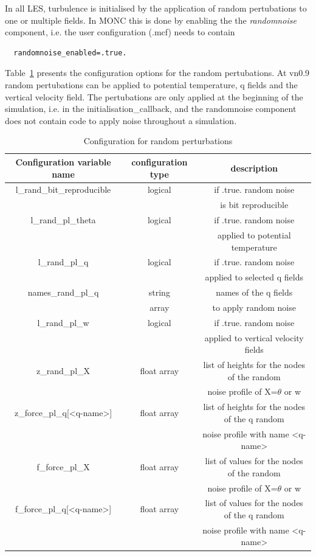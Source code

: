 \documentclass[a4paper,11pt]{article}
\begin{document}
In all LES, turbulence is initialised by the application of random pertubations to one or
multiple fields. In MONC this is done by enabling the the \emph{randomnoise} component, i.e.
the user configuration (.mcf) needs to contain

\begin{lstlisting}
  randomnoise_enabled=.true.
\end{lstlisting}

Table~\ref{tab:rand_pert} presents the configuration options for the random pertubations. At vn0.9
random pertubations can be applied to potential temperature, q fields and
the vertical velocity field. The pertubations are only applied at the beginning of
the simulation, i.e. in the initialisation\_callback, and the randomnoise component
does not contain code to apply noise throughout a simulation.

\begin{table}[H]
\protect\caption{Configuration for random perturbations}
\label{tab:rand_pert}
\begin{tabular}{|c|c|c|}
\hline
Configuration variable name & configuration type & description\tabularnewline
\hline
\hline
l\_rand\_bit\_reproducible & logical & if .true. random noise  \tabularnewline
 &  & is bit reproducible \tabularnewline
l\_rand\_pl\_theta & logical & if .true. random noise  \tabularnewline
 &  & applied to potential temperature \tabularnewline
\hline
l\_rand\_pl\_q & logical & if .true. random noise \tabularnewline
 &  & applied to selected q fields \tabularnewline
\hline
\hline
names\_rand\_pl\_q & string & names of the q fields \tabularnewline
 &  array & to apply random noise \tabularnewline
\hline
l\_rand\_pl\_w & logical & if .true. random noise \tabularnewline
 &  & applied to vertical velocity fields \tabularnewline
\hline
z\_rand\_pl\_X & float array & list of heights for the nodes of the random\tabularnewline
 &  & noise profile of X=$\theta$ or w\tabularnewline
\hline
z\_force\_pl\_q[\textless q-name\textgreater ] & float array & list of heights for the nodes of the q random \tabularnewline
 &  & noise profile with name \textless q-name\textgreater \tabularnewline
\hline
f\_force\_pl\_X & float array & list of values for the nodes of the random \tabularnewline
 &  & noise profile of X=$\theta$ or w\tabularnewline
\hline
f\_force\_pl\_q[\textless q-name\textgreater ] & float array & list of values for the nodes of the q random\tabularnewline
 &  & noise profile with name \textless q-name\textgreater \tabularnewline
\hline
\end{tabular}
\end{table}
\end{document}
